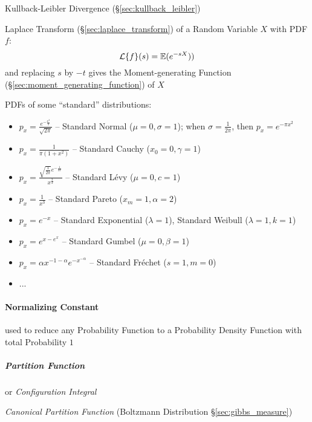 \fist Kullback-Leibler Divergence (\S\ref{sec:kullback_leibler})

Laplace Transform (\S\ref{sec:laplace_transform}) of a Random Variable $X$ with
PDF $f$:
\[
  \mathcal{L}\{f\}(s) = \mathbb{E}(e^{-sX}))
\]
and replacing $s$ by $-t$ gives the Moment-generating Function
(\S\ref{sec:moment_generating_function}) of $X$

\asterism

PDFs of some ``standard'' distributions:
\begin{itemize}
  \item $p_x = \frac{e^{-\frac{x^2}{2}}}{\sqrt{2 \pi}}$ -- Standard Normal
    ($\mu = 0, \sigma = 1$); when $\sigma = \frac{1}{2 \pi}$, then
    $p_x = e^{-\pi x^2}$
  \item $p_x = \frac{1}{\pi (1 + x^2)}$ -- Standard Cauchy
    ($x_0 = 0, \gamma = 1$)
  \item $p_x = \frac{\sqrt{\frac{1}{2 \pi}}e^{-\frac{1}{2 x}}}{x^{\frac{3}{2}}}$
    -- Standard L\'evy ($\mu = 0, c= 1$)
  \item $p_x = \frac{1}{x^3}$ -- Standard Pareto ($x_m = 1, \alpha = 2$)
  \item $p_x = e^{-x}$ -- Standard Exponential ($\lambda = 1$), Standard Weibull
    ($\lambda = 1, k = 1$)
  \item $p_x = e^{x - e^x}$ -- Standard Gumbel ($\mu = 0, \beta = 1$)
  \item $p_x = \alpha x^{-1-\alpha} e^{-x^{-\alpha}}$ -- Standard Fr\'echet
    ($s = 1, m = 0$)
  \item ...
\end{itemize}



\paragraph{Normalizing Constant}\label{sec:normalizing_constant}\hfill

used to reduce any Probability Function to a Probability Density Function with
total Probability $1$





\subparagraph{Partition Function}\label{sec:partition_function}\hfill

or \emph{Configuration Integral}

\emph{Canonical Partition Function} (Boltzmann Distribution
\S\ref{sec:gibbs_measure})

